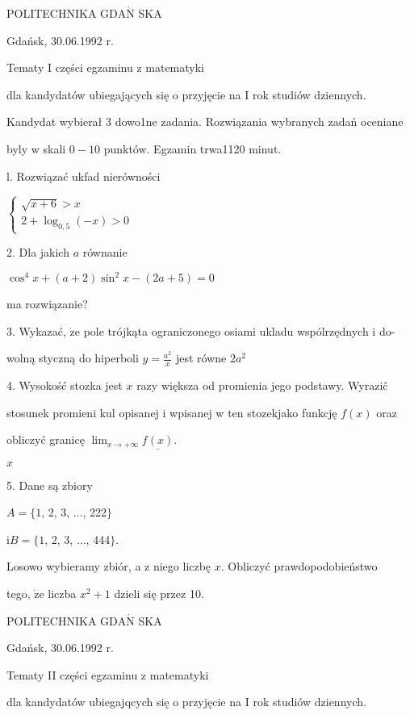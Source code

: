 \documentclass[a4paper,12pt]{article}
\begin{document}
POLITECHNIKA $\mathrm{G}\mathrm{D}\mathrm{A}\acute{\mathrm{N}}$ SKA

Gdańsk, 30.06.1992 r.

Tematy I części egzaminu z matematyki

dla kandydatów ubiegających się o przyjęcie na I rok studiów dziennych.

Kandydat wybierał 3 dowo1ne zadania. Rozwiązania wybranych zadań oceniane

byly w skali $0-10$ punktów. Egzamin trwa1120 minut.

l. Rozwiązać ukfad nierówności

$\left\{\begin{array}{l}
\sqrt{x+6}>x\\
2+\log_{0,5}(-x)>0
\end{array}\right.$

2. Dla jakich $a$ równanie

$\cos^{4}x+(a+2)\sin^{2}x-(2a+5)=0$

ma rozwiązanie?

3. Wykazać, $\dot{\mathrm{z}}\mathrm{e}$ pole trójkąta ograniczonego osiami ukladu wspólrzędnych i do-

wolną styczną do hiperboli $y=\displaystyle \frac{a^{2}}{x}$ jest równe $2a^{2}$

4. Wysokość stozka jest $x$ razy większa od promienia jego podstawy. Wyrazič

stosunek promieni kul opisanej i wpisanej w ten stozekjako funkcję $f(x)$ oraz

obliczyć granicę $\displaystyle \lim_{x\rightarrow+\infty} \underline{f(x)}.$

$x$

5. Dane są zbiory

$A=\{1$, 2, 3, $\ldots$, 222$\}$

$\mathrm{i} B=\{1$, 2, 3, $\ldots$, 444$\}.$

Losowo wybieramy zbiór, a z niego liczbę $x$. Obliczyć prawdopodobieństwo

tego, $\dot{\mathrm{z}}\mathrm{e}$ liczba $x^{2}+1$ dzieli się przez 10.




POLITECHNIKA $\mathrm{G}\mathrm{D}\mathrm{A}\acute{\mathrm{N}}$ SKA

Gdańsk, 30.06.1992 r.

Tematy II części egzaminu z matematyki

dla kandydatów ubiegajqcych się o przyjęcie na I rok studiów dziennych.
\end{document}
